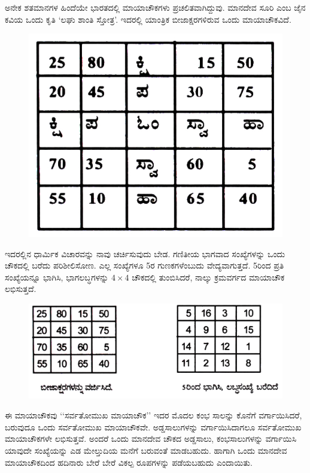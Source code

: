 ಅನೇಕ ಶತಮಾನಗಳ ಹಿಂದೆಯೇ ಭಾರತದಲ್ಲಿ ಮಾಯಾಚೌಕಗಳು ಪ್ರಚಲಿತವಾಗಿದ್ದುವು. ಮಾನದೇವ ಸೂರಿ ಎಂಬ ಜೈನ ಕವಿಯ ಒಂದು ಕೃತಿ ‘ಲಘು ಶಾಂತಿ ಸ್ತೋತ್ರ’. ಇದರಲ್ಲಿ ಯಾಂತ್ರಿಕ ಬೀಜಾಕ್ಷರಗಳಿರುವ ಒಂದು ಮಾಯಾಚೌಕವಿದೆ.
\begin{figure}[H]
\includegraphics{src/figures/chap4/fig4-8.jpg}
\end{figure}
ಇದರಲ್ಲಿನ ಧಾರ್ಮಿಕ ವಿಚಾರವನ್ನು ನಾವು ಚರ್ಚಿಸುವುದು ಬೇಡ. ಗಣಿತೀಯ ಭಾಗವಾದ ಸಂಖ್ಯೆಗಳನ್ನು ಒಂದು ಚೌಕದಲ್ಲಿ ಬರೆದು ಪರಿಶೀಲಿಸೋಣ. ಎಲ್ಲ ಸಂಖ್ಯೆಗಳೂ 5ರ ಗುಣಕಗಳೆಂಬುದು ವೇದ್ಯವಾಗುತ್ತದೆ. 5ರಿಂದ ಪ್ರತಿ ಸಂಖ್ಯೆಯನ್ನೂ ಭಾಗಿಸಿ, ಭಾಗಲಬ್ಧಗಳನ್ನು $4 \times 4$ ಚೌಕದಲ್ಲಿ ತುಂಬಿಸಿದರೆ, ನಾಲ್ಕು ಕ್ರಮವರ್ಗದ ಮಾಯಾಚೌಕ ಲಭಿಸುತ್ತದೆ.
\begin{figure}[H]
\includegraphics{src/figures/chap4/fig4-9.jpg}
\end{figure}

ಈ ಮಾಯಾಚೌಕವು ‘‘ಸರ್ವತೋಮುಖ ಮಾಯಾಚೌಕ’’ ಇದರ ಮೊದಲ ಕಂಭ ಸಾಲನ್ನು ಕೊನೆಗೆ ವರ್ಗಾಯಿಸಿದರೆ, ಬರುವುದೂ ಒಂದು ಸರ್ವತೋಮುಖ ಮಾಯಾಚೌಕವೇ. ಅಡ್ಡಸಾಲುಗಳನ್ನು ವರ್ಗಾಯಿಸಿದಾಗಲೂ ಸರ್ವತೋಮುಖ ಮಾಯಾಚೌಕಗಳೇ ಲಭಿಸುತ್ತವೆ. ಅಂದರೆ ಒಂದು ಮಾನದೇವ ಚೌಕದ ಅಡ್ಡಸಾಲು, ಕಂಭಸಾಲುಗಳನ್ನು ವರ್ಗಾಯಿಸಿ ಯಾವುದೇ ಸಂಖ್ಯೆಯನ್ನು ಎಡ ಮೇಲ್ತುದಿಯ ಮನೆಗೆ ಬರುವಂತೆ ಮಾಡಬಹುದು. ಹಾಗಾಗಿ ಒಂದು ಮಾನದೇವ ಮಾಯಾಚೌಕದಿಂದ ಹದಿನಾರು ಬೇರೆ ಬೇರೆ ವಿಕಲ್ಪ ರೂಪಗಳನ್ನು ಪಡೆಯಬಹುದು ಎಂದಾಯಿತು.

